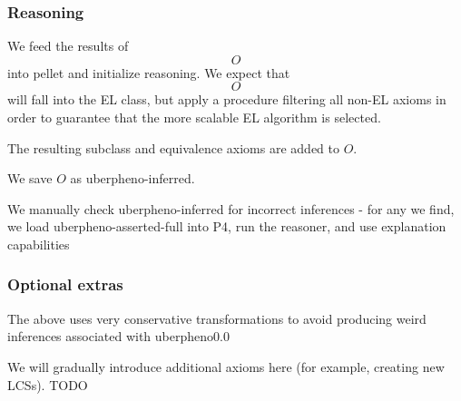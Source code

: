 \subsubsection{Reasoning}

We feed the results of $$O$$ into pellet and initialize reasoning. We
expect that $$O$$ will fall into the EL class, but apply a procedure
filtering all non-EL axioms in order to guarantee that the more
scalable EL algorithm is selected.

The resulting subclass and equivalence axioms are added to $O$.

We save $O$ as uberpheno-inferred.

We manually check uberpheno-inferred for incorrect inferences - for
any we find, we load uberpheno-asserted-full into P4, run the
reasoner, and use explanation capabilities

\subsubsection{Optional extras}

The above uses very conservative transformations to avoid producing
weird inferences associated with uberpheno0.0

We will gradually introduce additional axioms here (for example,
creating new LCSs). TODO







